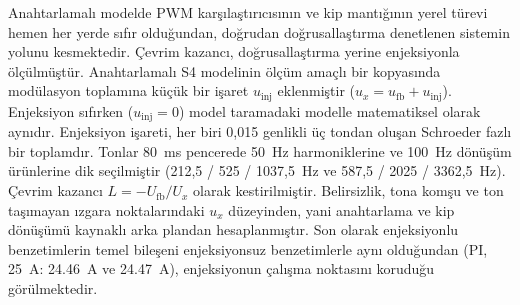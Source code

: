 Anahtarlamalı modelde PWM karşılaştırıcısının ve kip mantığının yerel türevi hemen her yerde sıfır olduğundan, doğrudan doğrusallaştırma denetlenen sistemin yolunu kesmektedir. Çevrim kazancı, doğrusallaştırma yerine enjeksiyonla ölçülmüştür. Anahtarlamalı S4 modelinin ölçüm amaçlı bir kopyasında modülasyon toplamına küçük bir işaret $u_{\mathrm{inj}}$ eklenmiştir ($u_x=u_{\mathrm{fb}}+u_{\mathrm{inj}}$). Enjeksiyon sıfırken ($u_{\mathrm{inj}}=0$) model taramadaki modelle matematiksel olarak aynıdır. Enjeksiyon işareti, her biri 0,015 genlikli üç tondan oluşan Schroeder fazlı bir toplamdır. Tonlar \SI{80}{\milli\second} pencerede \SI{50}{\hertz} harmoniklerine ve \SI{100}{\hertz} dönüşüm ürünlerine dik seçilmiştir (212,5 / 525 / 1037,5~Hz ve 587,5 / 2025 / 3362,5~Hz). Çevrim kazancı $L=-U_{\mathrm{fb}}/U_x$ olarak kestirilmiştir. Belirsizlik, tona komşu ve ton taşımayan ızgara noktalarındaki $u_x$ düzeyinden, yani anahtarlama ve kip dönüşümü kaynaklı arka plandan hesaplanmıştır. Son olarak enjeksiyonlu benzetimlerin temel bileşeni enjeksiyonsuz benzetimlerle aynı olduğundan (PI, \SI{25}{\ampere}: \SI{24.46}{\ampere} ve \SI{24.47}{\ampere}), enjeksiyonun çalışma noktasını koruduğu görülmektedir.

